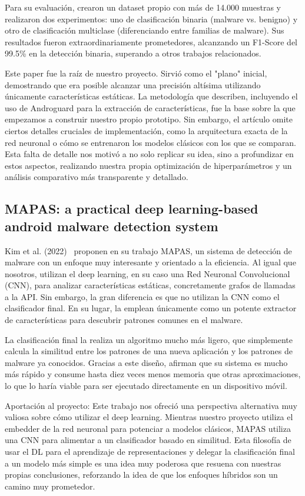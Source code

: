 Para su evaluación, crearon un dataset propio con más de 14.000 muestras y realizaron dos experimentos: uno de clasificación binaria (malware vs. benigno) y otro de clasificación multiclase (diferenciando entre familias de malware). Sus resultados fueron extraordinariamente prometedores, alcanzando un F1-Score del 99.5\% en la detección binaria, superando a otros trabajos relacionados.

Este paper fue la raíz de nuestro proyecto. Sirvió como el "plano" inicial, demostrando que era posible alcanzar una precisión altísima utilizando únicamente características estáticas. La metodología que describen, incluyendo el uso de Androguard para la extracción de características, fue la base sobre la que empezamos a construir nuestro propio prototipo. Sin embargo, el artículo omite ciertos detalles cruciales de implementación, como la arquitectura exacta de la red neuronal o cómo se entrenaron los modelos clásicos con los que se comparan. Esta falta de detalle nos motivó a no solo replicar su idea, sino a profundizar en estos aspectos, realizando nuestra propia optimización de hiperparámetros y un análisis comparativo más transparente y detallado.

\subsection{MAPAS: a practical deep learning-based android malware detection system}

Kim et al. (2022)~\cite{kim2022mapas} proponen en su trabajo MAPAS, un sistema de detección de malware con un enfoque muy interesante y orientado a la eficiencia. Al igual que nosotros, utilizan el deep learning, en su caso una Red Neuronal Convolucional (CNN), para analizar características estáticas, concretamente grafos de llamadas a la API. Sin embargo, la gran diferencia es que no utilizan la CNN como el clasificador final. En su lugar, la emplean únicamente como un potente extractor de características para descubrir patrones comunes en el malware.

La clasificación final la realiza un algoritmo mucho más ligero, que simplemente calcula la similitud entre los patrones de una nueva aplicación y los patrones de malware ya conocidos. Gracias a este diseño, afirman que su sistema es mucho más rápido y consume hasta diez veces menos memoria que otras aproximaciones, lo que lo haría viable para ser ejecutado directamente en un dispositivo móvil.

Aportación al proyecto: Este trabajo nos ofreció una perspectiva alternativa muy valiosa sobre cómo utilizar el deep learning. Mientras nuestro proyecto utiliza el embedder de la red neuronal para potenciar a modelos clásicos, MAPAS utiliza una CNN para alimentar a un clasificador basado en similitud. Esta filosofía de usar el DL para el aprendizaje de representaciones y delegar la clasificación final a un modelo más simple es una idea muy poderosa que resuena con nuestras propias conclusiones, reforzando la idea de que los enfoques híbridos son un camino muy prometedor.


